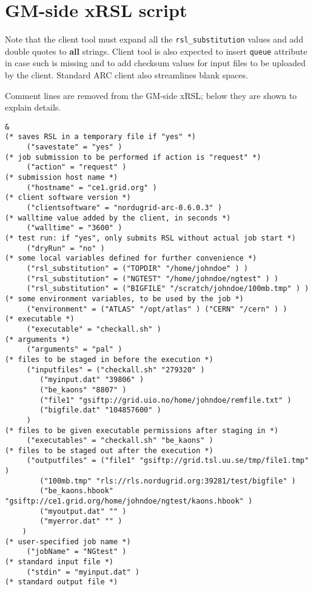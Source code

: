 \documentclass{book}
\begin{document}
  \section{GM-side xRSL script}

Note that the client tool must expand all the \texttt{rsl\_substitution}
values and add double quotes to \textbf{all} strings. Client tool is also expected to insert \texttt{queue} attribute in case such is missing and to add checksum values for input files to be uploaded by the client. Standard ARC client also
streamlines blank spaces. 

Comment lines are removed from the GM-side xRSL; below they are shown
to explain details.

  \begin{verbatim}
&
(* saves RSL in a temporary file if "yes" *)
     ("savestate" = "yes" )
(* job submission to be performed if action is "request" *)
     ("action" = "request" )
(* submission host name *)
     ("hostname" = "ce1.grid.org" )
(* client software version *)
     ("clientsoftware" = "nordugrid-arc-0.6.0.3" )
(* walltime value added by the client, in seconds *)
     ("walltime" = "3600" )
(* test run: if "yes", only submits RSL without actual job start *)
     ("dryRun" = "no" )
(* some local variables defined for further convenience *)
     ("rsl_substitution" = ("TOPDIR" "/home/johndoe" ) )
     ("rsl_substitution" = ("NGTEST" "/home/johndoe/ngtest" ) )
     ("rsl_substitution" = ("BIGFILE" "/scratch/johndoe/100mb.tmp" ) )
(* some environment variables, to be used by the job *)
     ("environment" = ("ATLAS" "/opt/atlas" ) ("CERN" "/cern" ) )
(* executable *)
     ("executable" = "checkall.sh" )
(* arguments *)
     ("arguments" = "pal" )
(* files to be staged in before the execution *)
     ("inputfiles" = ("checkall.sh" "279320" )
        ("myinput.dat" "39806" )
        ("be_kaons" "8807" )
        ("file1" "gsiftp://grid.uio.no/home/johndoe/remfile.txt" )
        ("bigfile.dat" "104857600" )
     )
(* files to be given executable permissions after staging in *)
     ("executables" = "checkall.sh" "be_kaons" )
(* files to be staged out after the execution *)
     ("outputfiles" = ("file1" "gsiftp://grid.tsl.uu.se/tmp/file1.tmp" )
        ("100mb.tmp" "rls://rls.nordugrid.org:39281/test/bigfile" )
        ("be_kaons.hbook" "gsiftp://ce1.grid.org/home/johndoe/ngtest/kaons.hbook" )
        ("myoutput.dat" "" )
        ("myerror.dat" "" )
    )
(* user-specified job name *)
     ("jobName" = "NGtest" )
(* standard input file *)
     ("stdin" = "myinput.dat" )
(* standard output file *)

\end{verbatim}
\end{document}
